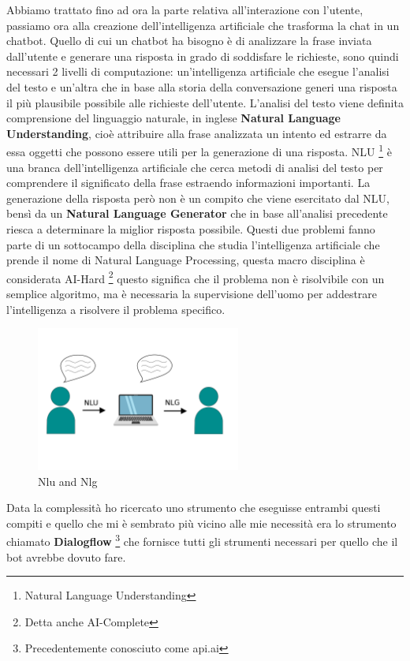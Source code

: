 Abbiamo trattato fino ad ora la parte relativa all'interazione con l'utente, passiamo ora alla creazione dell'intelligenza artificiale che  trasforma la chat in un chatbot. Quello di cui un chatbot ha bisogno è di analizzare la frase inviata dall'utente e generare una risposta in grado di soddisfare le richieste, sono quindi necessari 2 livelli di computazione: un'intelligenza artificiale che esegue l'analisi del testo e un'altra che in base alla storia della conversazione generi una risposta il più plausibile possibile alle richieste dell'utente.
L'analisi del testo viene definita comprensione del linguaggio naturale, in inglese \textbf{Natural Language Understanding}, cioè attribuire alla frase analizzata un intento ed estrarre da essa oggetti che possono essere utili per la generazione di una risposta.
NLU \footnote{Natural Language Understanding} è una branca dell'intelligenza artificiale che cerca metodi di analisi del testo per comprendere il significato della frase estraendo informazioni importanti. 
La generazione della risposta però non è un compito che viene esercitato dal NLU, bensì da un \textbf{Natural Language Generator} che in base all'analisi precedente riesca a determinare la miglior risposta possibile.
Questi due problemi fanno parte di un sottocampo della disciplina che studia l'intelligenza artificiale che prende il nome di Natural Language Processing, questa macro disciplina è considerata AI-Hard \footnote{Detta anche AI-Complete} questo significa che il problema non è risolvibile con un semplice algoritmo, ma è necessaria la supervisione dell'uomo per addestrare l'intelligenza a risolvere il problema specifico.
\begin{figure}[H]
 \centering
    \includegraphics[width=0.6\textwidth]{img/nlu_nlg.png}
 \caption{Nlu and Nlg}
\end{figure}
Data la complessità ho ricercato uno strumento che eseguisse entrambi questi compiti e quello che mi è sembrato più vicino alle mie necessità era lo strumento chiamato \textbf{Dialogflow} \footnote{Precedentemente conosciuto come api.ai} che fornisce tutti gli strumenti necessari per quello che il bot avrebbe dovuto fare.
